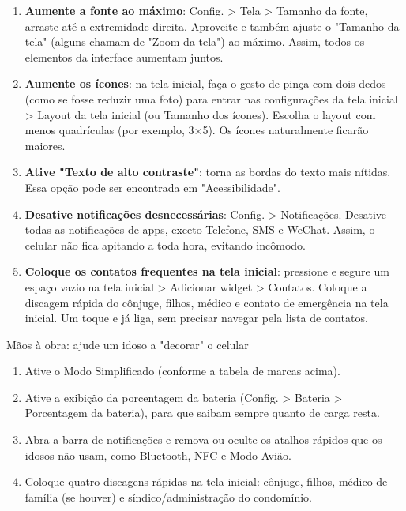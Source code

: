 \begin{enumerate}
  \item \textbf{Aumente a fonte ao máximo}: Config. > Tela > Tamanho da fonte, arraste até a extremidade direita. Aproveite e também ajuste o "Tamanho da tela" (alguns chamam de "Zoom da tela") ao máximo. Assim, todos os elementos da interface aumentam juntos.
  \item \textbf{Aumente os ícones}: na tela inicial, faça o gesto de pinça com dois dedos (como se fosse reduzir uma foto) para entrar nas configurações da tela inicial > Layout da tela inicial (ou Tamanho dos ícones). Escolha o layout com menos quadrículas (por exemplo, 3×5). Os ícones naturalmente ficarão maiores.
  \item \textbf{Ative "Texto de alto contraste"}: torna as bordas do texto mais nítidas. Essa opção pode ser encontrada em "Acessibilidade".
  \item \textbf{Desative notificações desnecessárias}: Config. > Notificações. Desative todas as notificações de apps, exceto Telefone, SMS e WeChat. Assim, o celular não fica apitando a toda hora, evitando incômodo.
  \item \textbf{Coloque os contatos frequentes na tela inicial}: pressione e segure um espaço vazio na tela inicial > Adicionar widget > Contatos. Coloque a discagem rápida do cônjuge, filhos, médico e contato de emergência na tela inicial. Um toque e já liga, sem precisar navegar pela lista de contatos.
\end{enumerate}

\begin{tcbpractice}{Mãos à obra: ajude um idoso a "decorar" o celular}
\begin{enumerate}
  \item Ative o Modo Simplificado (conforme a tabela de marcas acima).
  \item Ative a exibição da porcentagem da bateria (Config. > Bateria > Porcentagem da bateria), para que saibam sempre quanto de carga resta.
  \item Abra a barra de notificações e remova ou oculte os atalhos rápidos que os idosos não usam, como Bluetooth, NFC e Modo Avião.
  \item Coloque quatro discagens rápidas na tela inicial: cônjuge, filhos, médico de família (se houver) e síndico/administração do condomínio.
\end{enumerate}

\end{tcbpractice}

